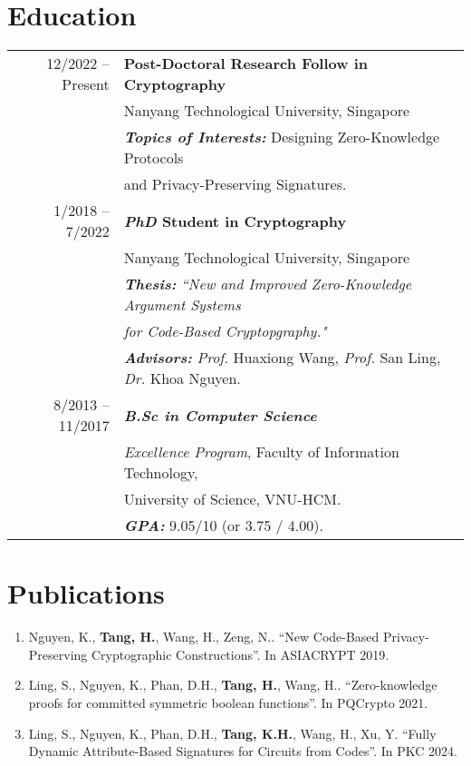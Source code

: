\documentclass[a4paper, 11pt]{article}
\begin{document}
	\section{Education}
	\begin{tabular}{rl}	
		12/2022 -- Present & \textbf{Post-Doctoral Research Follow in Cryptography} \\
		& Nanyang Technological University, Singapore   \\
		\ & \textbf{\textit{Topics of Interests:}} Designing Zero-Knowledge Protocols\\ &and Privacy-Preserving Signatures.\\
		1/2018 -- 7/2022 & \textbf{\textit{PhD} Student in Cryptography} \\
		& Nanyang Technological University, Singapore   \\
		\ & \textbf{\textit{Thesis:}} \textit{``New and Improved Zero-Knowledge Argument Systems}\\&\textit{           for Code-Based Cryptopgraphy."}\\
		
		\ & \textbf{\textit{Advisors:}} \textit{Prof.}\! Huaxiong Wang, \textit{Prof.}\! San Ling, \textit{Dr.}\! Khoa Nguyen.\\
		8/2013 -- 11/2017 & \textbf{\textit{B.Sc in Computer Science}} \\ 
		& \textit{Excellence Program}, Faculty of Information Technology,\\ &University of Science, VNU-HCM.\\
		\ & \textbf{\textit{GPA:}} 9.05/10 (or 3.75 / 4.00).
	\end{tabular}
	
	\section{Publications}
	\begin{enumerate}
		\item Nguyen, K., \textbf{Tang, H.}, Wang, H., Zeng, N.. ``New Code-Based Privacy-Preserving Cryptographic Constructions''. In ASIACRYPT 2019.
	
		\item Ling, S., Nguyen, K., Phan, D.H., \textbf{Tang, H.}, Wang, H.. ``Zero-knowledge
	proofs for committed symmetric boolean functions''. In PQCrypto 2021.
	
		\item Ling, S., Nguyen, K., Phan, D.H., \textbf{Tang, K.H.}, Wang, H., Xu, Y. ``Fully Dynamic Attribute-Based Signatures for Circuits from Codes''. In PKC 2024.
	\end{enumerate}
	
\end{document}
